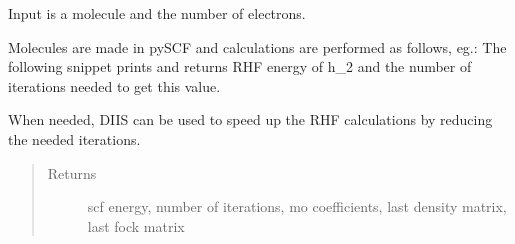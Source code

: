 \documentclass[letterpaper,10pt,english]{sphinxmanual}
\begin{document}
\begin{fulllineitems}
\label{\detokenize{RHF:ghf.RHF.RHF}}
Input is a molecule and the number of electrons.

Molecules are made in pySCF and calculations are performed as follows, eg.:
The following snippet prints and returns RHF energy of h\_2
and the number of iterations needed to get this value.

\begin{sphinxVerbatim}[commandchars=\\\{\}]
          
   
\end{sphinxVerbatim}

\begin{fulllineitems}
\label{\detokenize{RHF:ghf.RHF.RHF.diis}}
When needed, DIIS can be used to speed up the RHF calculations by reducing the needed iterations.
\begin{quote}\begin{description}
\item[{Returns}] \leavevmode
scf energy, number of iterations, mo coefficients, last density matrix, last fock matrix

\end{description}\end{quote}

\end{fulllineitems}



\end{fulllineitems}
\end{document}
